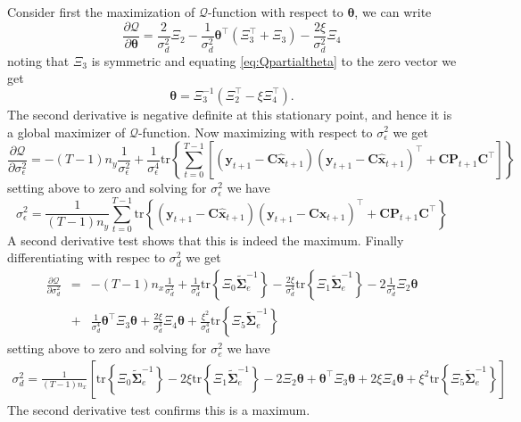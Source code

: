 \documentclass[]{article}
\begin{document}
Consider first the maximization of $\mathcal{Q}$-function with respect to $\boldsymbol\theta$, we can write
\begin{equation}\label{eq:Qpartialtheta}
 \frac{\partial \mathcal Q}{\partial \boldsymbol\theta}=\frac{2}{\sigma_d^2}\Xi_2-\frac{1}{\sigma_d^2}\boldsymbol\theta^\top(\Xi_3^\top+\Xi_3)-\frac{2\xi}{\sigma_d^2}\Xi_4
\end{equation}
noting that $\Xi_3$ is symmetric and equating \ref{eq:Qpartialtheta} to the zero vector we get
\begin{equation}\label{eq:theta}
 \boldsymbol \theta=\Xi_3^{-1}\left(\Xi_2^\top-\xi\Xi_4^\top \right).
\end{equation}
The second derivative is negative definite at this stationary point, and hence it is a global maximizer of $\mathcal{Q}$-function.
Now maximizing with respect to $\sigma_{\epsilon}^2$ we get
\begin{equation}
  \frac{\partial \mathcal Q}{\partial \sigma_{\epsilon}^2}=-(T-1)n_y\frac{1}{\sigma_{\epsilon}^2}+\frac{1}{\sigma_{\epsilon}^4}\mathrm{tr}\left\lbrace\sum_{t=0}^{T-1}\left[ (\mathbf y_{t+1}-\mathbf C\mathbf{\hat{x}}_{t+1}) (\mathbf y_{t+1}-\mathbf C\mathbf{\hat{x}}_{t+1})^\top+\mathbf C \mathbf P_{t+1}\mathbf C^\top\right] \right\rbrace
\end{equation}
setting above to zero and solving for $\sigma_{\epsilon}^2$ we have
\begin{equation}
 \sigma_{\epsilon}^2=\frac{1}{(T-1)n_y}\sum_{t=0}^{T-1}\mathrm{tr}\left\lbrace (\mathbf y_{t+1}-\mathbf C\mathbf{\hat{x}}_{t+1}) (\mathbf y_{t+1}-\mathbf C\mathbf{\hat{x}}_{t+1})^\top+\mathbf C \mathbf P_{t+1}\mathbf C^\top \right\rbrace
\end{equation}
A second derivative test shows that this is indeed the maximum. Finally differentiating with respec to $\sigma_d^2$ we get
\begin{eqnarray}
 \frac{\partial \mathcal Q}{\partial \sigma_d^2}&=& -(T-1)n_x\frac{1}{\sigma_d^2}+\frac{1}{\sigma_d^4}\mathrm{tr}\left\lbrace \Xi_0 \tilde{\boldsymbol\Sigma}_e^{-1}\right\rbrace-\frac{2\xi}{\sigma_d^4} \mathrm{tr}\left\lbrace \Xi_1 \tilde{\boldsymbol\Sigma}_e^{-1}\right\rbrace -2\frac{1}{\sigma_d^4}\Xi_2\boldsymbol\theta \nonumber \\
&+&\frac{1}{\sigma_d^4}\boldsymbol\theta^\top \Xi_3\boldsymbol\theta+\frac{2\xi}{\sigma_d^4} \Xi_4 \boldsymbol\theta +\frac{\xi^2}{\sigma_d^4}\mathrm{tr} \left\lbrace\Xi_5\tilde{\boldsymbol\Sigma}_e^{-1} \right\rbrace 
\end{eqnarray}
setting above to zero and solving for $\sigma_e^2$ we have
\begin{eqnarray}
\sigma_d^2=\frac{1}{(T-1)n_x}\left[ \mathrm{tr}\left\lbrace \Xi_0 \tilde{\boldsymbol\Sigma}_e^{-1}\right\rbrace-
2\xi\mathrm{tr}\left\lbrace \Xi_1 \tilde{\boldsymbol\Sigma}_e^{-1}\right\rbrace -2\Xi_2\boldsymbol\theta+\boldsymbol\theta^\top \Xi_3\boldsymbol\theta+2\xi\Xi_4 \boldsymbol\theta +\xi^2\mathrm{tr} \left\lbrace\Xi_5\tilde{\boldsymbol\Sigma}_e^{-1} \right\rbrace \right]  
\end{eqnarray}
The second derivative test confirms this is a maximum.
\end{document}
